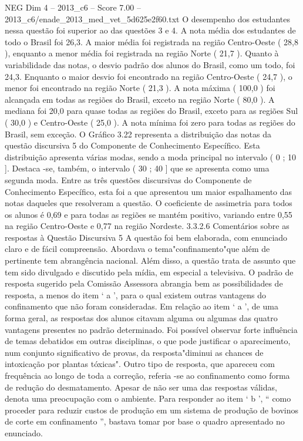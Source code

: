 \begin{textsample}{NEG Dim 4 – 2013\_c6 – Score 7.00 – 2013\_c6/enade\_2013\_med\_vet\_5d625e2f60.txt}
O desempenho dos estudantes nessa questão foi superior ao das questões 3 e 4.
A nota média dos estudantes de todo o Brasil foi 26,3.
A maior média foi registrada na região Centro-Oeste ( 28,8 ), enquanto a menor média foi registrada na região Norte ( 21,7 ).
Quanto à variabilidade das notas, o desvio padrão dos alunos do Brasil, como um todo, foi 24,3.
Enquanto o maior desvio foi encontrado na região Centro-Oeste ( 24,7 ), o menor foi encontrado na região Norte ( 21,3 ).
A nota máxima ( 100,0 ) foi alcançada em todas as regiões do Brasil, exceto na região Norte ( 80,0 ).
A mediana foi 20,0 para quase todas as regiões do Brasil, exceto para as regiões Sul ( 30,0 ) e Centro-Oeste ( 25,0 ).
A nota mínima foi zero para todas as regiões do Brasil, sem exceção.
O Gráfico 3.22 representa a distribuição das notas da questão discursiva 5 do Componente de Conhecimento Específico.
Esta distribuição apresenta várias modas, sendo a moda principal no intervalo ( 0 ; 10 ].
Destaca -se, também, o intervalo ( 30 ; 40 ] que se apresenta como uma segunda moda.
Entre as três questões discursivas do Componente de Conhecimento Específico, esta foi a que apresentou um maior espalhamento das notas daqueles que resolveram a questão.
O coeficiente de assimetria para todos os alunos é 0,69 e para todas as regiões se mantém positivo, variando entre 0,55 na região Centro-Oeste e 0,77 na região Nordeste. 3.3.2.6 Comentários sobre as respostas à Questão Discursiva 5 A questão foi bem elaborada, com enunciado claro e de fácil compreensão.
Abordava o tema"confinamento"que além de pertinente tem abrangência nacional.
Além disso, a questão trata de assunto que tem sido divulgado e discutido pela mídia, em especial a televisiva.
O padrão de resposta sugerido pela Comissão Assessora abrangia bem as possibilidades de resposta, a menos do item ‘ a ’, para o qual existem outras vantagens do confinamento que não foram consideradas.
Em relação ao item ‘ a ’, de uma forma geral, as respostas dos alunos citavam alguma ou algumas das quatro vantagens presentes no padrão determinado.
Foi possível observar forte influência de temas debatidos em outras disciplinas, o que pode justificar o aparecimento, num conjunto significativo de provas, da resposta"diminui as chances de intoxicação por plantas tóxicas".
Outro tipo de resposta, que apareceu com frequência ao longo de toda a correção, referia -se ao confinamento como forma de redução do desmatamento.
Apesar de não ser uma das respostas válidas, denota uma preocupação com o ambiente.
Para responder ao item ‘ b ’, “ como proceder para reduzir custos de produção em um sistema de produção de bovinos de corte em confinamento ”, bastava tomar por base o quadro apresentado no enunciado.

\end{textsample}
